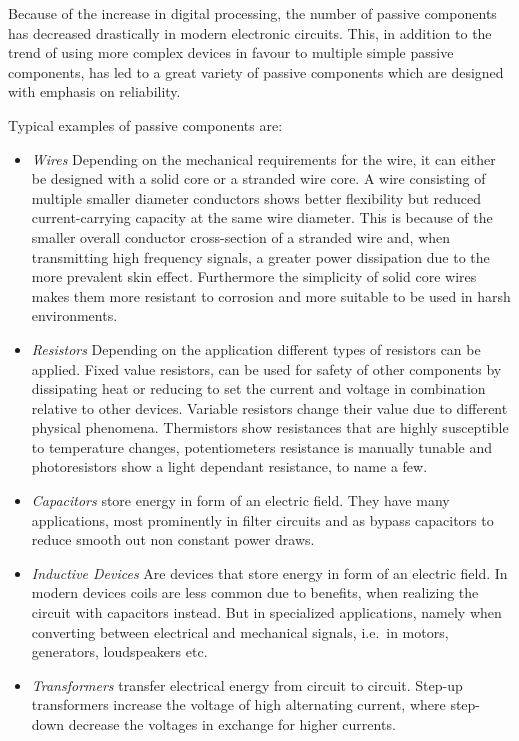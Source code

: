 Because of the increase in digital processing, the number of passive components has decreased drastically in modern electronic circuits. This, in addition to the trend of using more complex devices in favour to multiple simple passive components, has led to a great variety of passive components which are designed with emphasis on reliability.

Typical examples of passive components are:
\begin{itemize}
  \item \emph{Wires} Depending on the mechanical requirements for the wire, it can either be designed with a solid core or a stranded wire core. A wire consisting of multiple smaller diameter conductors shows better flexibility but reduced current-carrying capacity at the same wire diameter. This is because of the smaller overall conductor cross-section of a stranded wire and, when transmitting high frequency signals, a greater power dissipation due to the more prevalent skin effect. Furthermore the simplicity of solid core wires makes them more resistant to corrosion and more suitable to be used in harsh environments.
  \item \emph{Resistors} Depending on the application different types of resistors can be applied. Fixed value resistors, can be used for safety of other components by dissipating heat or reducing to set the current and voltage in combination relative to other devices. Variable resistors change their value due to different physical phenomena. Thermistors show resistances that are highly susceptible to temperature changes, potentiometers resistance is manually tunable and photoresistors show a light dependant resistance, to name a few.
  \item \emph{Capacitors} store energy in form of an electric field. They have many applications, most prominently in filter circuits and as bypass capacitors to reduce smooth out non constant power draws.
  \item \emph{Inductive Devices} Are devices that store energy in form of an electric field. In modern devices coils are less common due to benefits, when realizing the circuit with capacitors instead. But in specialized applications, namely when converting between electrical and mechanical signals, i.e.\ in motors, generators, loudspeakers etc.
  \item \emph{Transformers} transfer electrical energy from circuit to circuit. Step-up transformers increase the voltage of high alternating current, where step-down decrease the voltages in exchange for higher currents.
\end{itemize}

